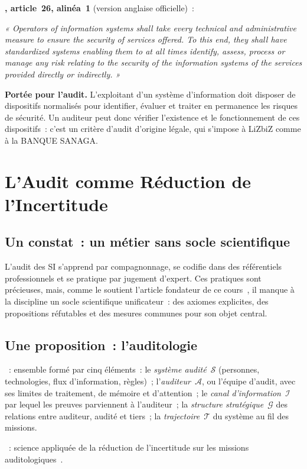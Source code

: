 \begin{boxjuris}
\textbf{, article~26, alinéa~1} (version anglaise
officielle)~:

\medskip
\textit{« Operators of information systems shall take every technical and
administrative measure to ensure the security of services offered. To
this end, they shall have standardized systems enabling them to at all
times identify, assess, process or manage any risk relating to the
security of the information systems of the services provided directly or
indirectly. »}

\medskip
\textbf{Portée pour l'audit.} L'exploitant d'un système d'information doit
disposer de dispositifs normalisés pour identifier, évaluer et traiter en
permanence les risques de sécurité. Un auditeur peut donc vérifier
l'existence et le fonctionnement de ces dispositifs~: c'est un critère
d'audit d'origine légale, qui s'impose à LiZbiZ comme à la BANQUE SANAGA.
\end{boxjuris}

\section{L'Audit comme Réduction de l'Incertitude}
\label{sec:c01-auditologie}

\subsection{Un constat~: un métier sans socle scientifique}

L'audit des SI s'apprend par compagnonnage, se codifie dans des référentiels
professionnels et se pratique par jugement d'expert. Ces pratiques sont
précieuses, mais, comme le soutient l'article fondateur de ce
cours~\cite{minka2026auditologie}, il manque à la discipline un socle
scientifique unificateur~: des axiomes explicites, des propositions
réfutables et des mesures communes pour son objet central.

\subsection{Une proposition~: l'auditologie}

\begin{boxdef}
~: ensemble
formé par cinq éléments~: le \emph{système audité}~$\mathcal{S}$ (personnes,
technologies, flux d'information, règles)~; l'\emph{auditeur}~$\mathcal{A}$,
ou l'équipe d'audit, avec ses limites de traitement, de mémoire et
d'attention~; le \emph{canal d'information}~$\mathcal{I}$ par lequel les
preuves parviennent à l'auditeur~; la \emph{structure stratégique}~$\mathcal{G}$
des relations entre auditeur, audité et tiers~; la \emph{trajectoire}~$\mathcal{T}$
du système au fil des missions.

\medskip
{}~: science appliquée de la
réduction de l'incertitude sur les missions
auditologiques~\cite{minka2026auditologie}.
\end{boxdef}

